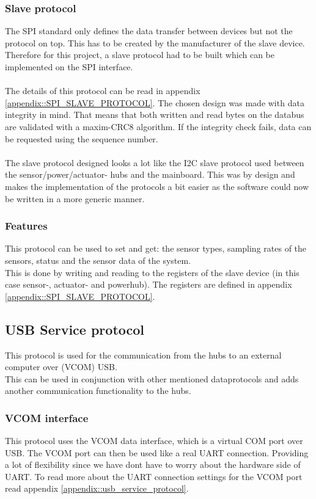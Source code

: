 \subsubsection{Slave protocol}
The SPI standard only defines the data transfer between devices but not the protocol on top. This has to be created by the manufacturer of the slave device. Therefore for this project, a slave protocol had to be built which can be implemented on the SPI interface.\\\\
The details of this protocol can be read in appendix \ref{appendix::SPI_SLAVE_PROTOCOL}. The chosen design was made with data integrity in mind. That means that both written and read bytes on the databus are validated with a maxim-CRC8 algorithm. If the integrity check fails, data can be requested using the sequence number. \\\\
The slave protocol designed looks a lot like the I2C slave protocol used between the sensor/power/actuator- hubs and the mainboard. This was by design and makes the implementation of the protocols a bit easier as the software could now be written in a more generic manner. \\
\pagebreak
\subsubsection{Features}
This protocol can be used to set and get: the sensor types, sampling rates of the sensors, status and the sensor data of the system. \\ This is done by writing and reading to the registers of the slave device (in this case sensor-, actuator- and powerhub). The registers are defined in appendix \ref{appendix::SPI_SLAVE_PROTOCOL}.

\subsection{USB Service protocol}
This protocol is used for the communication from the hubs to an external computer over (VCOM) USB.\\ This can be used in conjunction with other mentioned dataprotocols and adds another communication functionality to the hubs.\\

\subsubsection{VCOM interface}
This protocol uses the VCOM data interface, which is a virtual COM port over USB. The VCOM port can then be used like a real UART connection. Providing a lot of flexibility since we have dont have to worry about the hardware side of UART. To read more about the UART connection settings for the VCOM port read appendix \ref{appendix::usb_service_protocol}.


